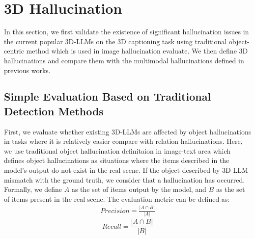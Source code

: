 \section{3D Hallucination}
\label{sec::system}
In this section, we first validate the existence of significant hallucination issues in the current popular 3D-LLMs on the 3D captioning task using traditional object-centric method which is used in image hallucination evaluate. We then define 3D hallucinations and compare them with the multimodal hallucinations defined in previous works.

\subsection{Simple Evaluation Based on Traditional Detection Methods}
\begin{table}[H]
    \centering
    \caption{Evaluate Result of Sota 3D-LLM}
    \label{table:hallucinatiovalid}
\end{table}
First, we evaluate whether existing 3D-LLMs are affected by object hallucinations in tasks where it is relatively easier compare with relation hallucinations. Here, we use traditional object hallucination definitaion in image-text area which defines object hallucinations as situations where the items described in the model's output do not exist in the real scene. If the object described by 3D-LLM mismatch with the ground truth, we consider that a hallucination has occurred. Formally, we define \( A \) as the set of items output by the model, and \( B \) as the set of items present in the real scene. The evaluation metric can be defined as:
 \begin{align}
      Precision= \frac{|A \cap B|}{|A|} 
\end{align}
 \begin{equation}
      Recall= \frac{|A \cap B|}{|B|} 
 \end{equation}
 
